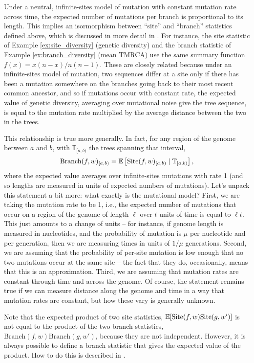 \documentclass{article}
\newcommand{\branch}{\mbox{Branch}} %
\newcommand{\site}{\mbox{Site}} %
\newcommand{\given}{\;\vert\;}
\newcommand{\treeseq}{\mathbb{T}} %
\newcommand{\iw}{w} %
\begin{document}
Under a neutral, infinite-sites model of mutation with constant mutation rate across time,
the expected number of mutations per branch is proportional to its length.
This implies an isormorphism between ``site'' and ``branch'' statistics defined above,
which is discussed in more detail in \citet{ralph2019empirical}.
For instance, the site statistic of Example \ref{ex:site_diversity} (genetic diversity)
and the branch statistic of Example \ref{ex:branch_diversity} (mean TMRCA)
use the same summary function $f(x) = x(n-x)/n(n-1)$.
These are closely related because under an infinite-sites model of mutation,
two sequences differ at a site only if there has been a mutation somewhere on the branches going back
to their most recent common ancestor,
and so if mutations occur with constant rate,
the expected value of genetic diversity,
averaging over mutational noise give the tree sequence,
is equal to the mutation rate multiplied by the average distance between the two in the trees.

This relationship is true more generally.
In fact, for any region of the genome between $a$ and $b$,
with $\treeseq_{[a,b)}$ the trees spanning that interval,
\begin{align}
    \branch(f, \iw)_{[a,b)}
    =
    \E\left[ \site(f, \iw)_{[a,b)} \given \treeseq_{[a,b)} \right] ,
\end{align}
where the expected value averages over infinite-sites mutations with rate 1
(and so lengths are measured in units of expected numbers of mutations).
Let's unpack this statement a bit more: what exactly is the mutational model?
First, we are taking the mutation rate to be 1, i.e.,
the expected number of mutations that occur on a region of the genome of length $\ell$
over $t$ units of time is equal to $\ell t$.
This just amounts to a change of units --
for instance, if genome length is measured in nucleotides,
and the probability of mutation is $\mu$ per nucleotide and per generation,
then we are measuring times in units of $1/\mu$ generations.
Second, we are assuming that the probability of per-site mutation is low enough
that no two mutations occur at the same site
-- the fact that they do, occasionally, means that this is an approximation.
Third, we are assuming that mutation rates are constant through time and across the genome.
Of course, the statement remains true if we can measure distance along the genome and time
in a way that mutation rates are constant, but how these vary is generally unknown.

Note that the expected product of two site statistics,
$\E[\site(f, \iw) \site(g, \iw')]$
is not equal to the product of the two branch statistics, $\branch(f, \iw) \branch(g, \iw')$,
because they are not independent.
However, it is always possible to define a branch statistic that
gives the expected value of the product.
How to do this is described in \citet{ralph2019empirical}.
\end{document}
